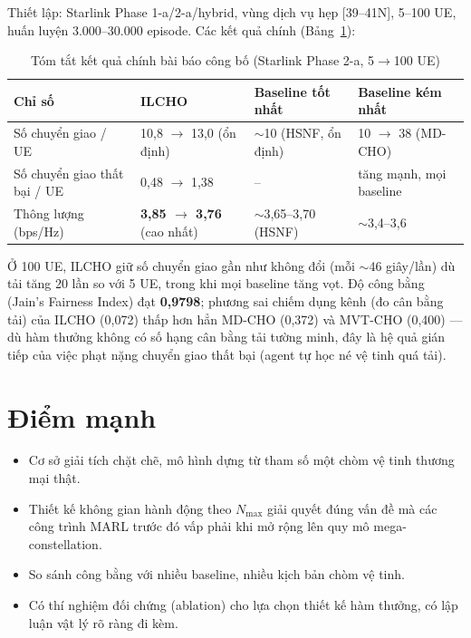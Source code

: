 \documentclass[12pt,a4paper]{article}
\begin{document}
Thiết lập: Starlink Phase 1-a/2-a/hybrid, vùng dịch vụ hẹp [39--41\textdegree{}N], 5--100 UE,
huấn luyện 3.000--30.000 episode. Các kết quả chính (Bảng~\ref{tab:results}):

\begin{table}[h]
\centering\small
\caption{Tóm tắt kết quả chính bài báo công bố (Starlink Phase 2-a, 5$\to$100 UE)}
\label{tab:results}
\begin{tabular}{@{}p{3.6cm}p{3.6cm}p{3cm}p{3cm}@{}}
\toprule
\textbf{Chỉ số} & \textbf{ILCHO} & \textbf{Baseline tốt nhất} & \textbf{Baseline kém nhất} \\
\midrule
Số chuyển giao / UE & 10,8 $\to$ 13,0 (ổn định) & $\sim$10 (HSNF, ổn định) & 10 $\to$ 38 (MD-CHO) \\
Số chuyển giao thất bại / UE & 0,48 $\to$ 1,38 & -- & tăng mạnh, mọi baseline \\
Thông lượng (bps/Hz) & \textbf{3,85 $\to$ 3,76} (cao nhất) & $\sim$3,65--3,70 (HSNF) & $\sim$3,4--3,6 \\
\bottomrule
\end{tabular}
\end{table}

Ở 100 UE, ILCHO giữ số chuyển giao gần như không đổi (mỗi $\sim$46 giây/lần) dù tải tăng 20
lần so với 5 UE, trong khi mọi baseline tăng vọt. Độ công bằng (Jain's Fairness Index) đạt
\textbf{0,9798}; phương sai chiếm dụng kênh (đo cân bằng tải) của ILCHO (0,072) thấp hơn hẳn
MD-CHO (0,372) và MVT-CHO (0,400) — dù hàm thưởng không có số hạng cân bằng tải tường minh,
đây là hệ quả gián tiếp của việc phạt nặng chuyển giao thất bại (agent tự học né vệ tinh quá
tải).

\section{Điểm mạnh}

\begin{itemize}[leftmargin=1.2em]
  \item Cơ sở giải tích chặt chẽ, mô hình dựng từ tham số một chòm vệ tinh thương mại thật.
  \item Thiết kế không gian hành động theo $N_{\max}$ giải quyết đúng vấn đề mà các công trình
        MARL trước đó vấp phải khi mở rộng lên quy mô mega-constellation.
  \item So sánh công bằng với nhiều baseline, nhiều kịch bản chòm vệ tinh.
  \item Có thí nghiệm đối chứng (ablation) cho lựa chọn thiết kế hàm thưởng, có lập luận vật lý
        rõ ràng đi kèm.
\end{itemize}
\end{document}
